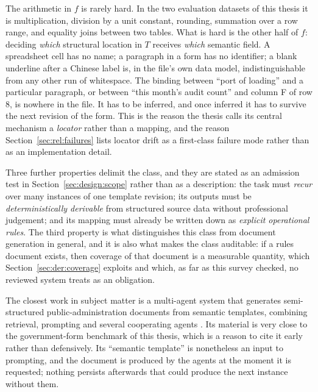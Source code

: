 The arithmetic in $f$ is rarely hard. In the two evaluation datasets of this thesis it is
multiplication, division by a unit constant, rounding, summation over a row range, and equality
joins between two tables. What is hard is the other half of $f$: deciding \emph{which}
structural location in $T$ receives \emph{which} semantic field. A spreadsheet cell has no
name; a paragraph in a form has no identifier; a blank underline after a Chinese label is, in
the file's own data model, indistinguishable from any other run of whitespace. The binding
between ``port of loading'' and a particular paragraph, or between ``this month's audit count''
and column F of row 8, is nowhere in the file. It has to be inferred, and once inferred it has
to survive the next revision of the form. This is the reason the thesis calls its central
mechanism a \emph{locator} rather than a mapping, and the reason
Section~\ref{sec:rel:failures} lists locator drift as a first-class failure mode rather than as
an implementation detail.

Three further properties delimit the class, and they are stated as an admission test in
Section~\ref{sec:design:scope} rather than as a description: the task must \emph{recur} over
many instances of one template revision; its outputs must be \emph{deterministically
derivable} from structured source data without professional judgement; and its mapping must
already be written down as \emph{explicit operational rules}. The third property is what
distinguishes this class from document generation in general, and it is also what makes the
class auditable: if a rules document exists, then coverage of that document is a measurable
quantity, which Section~\ref{sec:der:coverage} exploits and which, as far as this survey
checked, no reviewed system treats as an obligation.

The closest work in subject matter is a multi-agent system that generates semi-structured
public-administration documents from semantic templates, combining retrieval, prompting and
several cooperating agents \cite{musumeci2024semantictemplates}. Its material is very close to
the government-form benchmark of this thesis, which is a reason to cite it early rather than
defensively. Its ``semantic template'' is nonetheless an input to prompting, and the document
is produced by the agents at the moment it is requested; nothing persists afterwards that could
produce the next instance without them.

